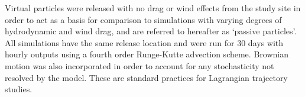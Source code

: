 \documentclass[
]{article}
\begin{document}
Virtual particles were released with no drag or wind effects from the
study site in order to act as a basis for comparison to simulations with
varying degrees of hydrodynamic and wind drag, and are referred to
hereafter as `passive particles'. All simulations have the same release
location and were run for 30 days with hourly outputs using a fourth
order Runge-Kutte advection scheme. Brownian motion was also
incorporated in order to account for any stochasticity not resolved by
the model. These are standard practices for Lagrangian trajectory
studies.

\providecommand{\docline}[3]{\noalign{\global\setlength{\arrayrulewidth}{#1}}\arrayrulecolor[HTML]{#2}\cline{#3}}

\setlength{\tabcolsep}{8pt}

\renewcommand*{\arraystretch}{1.5}
\end{document}
